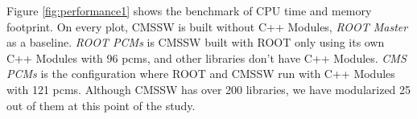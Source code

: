 \documentclass[12pt]{iopart}
\begin{document}
Figure \ref{fig:performance1} shows the benchmark of CPU time and memory footprint. On every plot, CMSSW is built without C++ Modules, \textit{ROOT Master} as a baseline. \textit{ROOT PCMs} is CMSSW built with ROOT only using its own C++ Modules with 96 pcms, and other libraries don't have C++ Modules. \textit{CMS PCMs} is the configuration where ROOT and CMSSW run with C++ Modules with 121 pcms. Although CMSSW has over 200 libraries, we have modularized 25 out of them at this point of the study.

\begin{figure}[h]
\centering
\begin{minipage}{.48\textwidth}
\end{minipage}\hfill
\begin{minipage}{.48\textwidth}

\end{minipage}
\end{figure}
\end{document}
